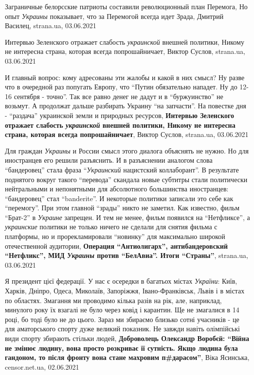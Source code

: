Заграничные белорсские патриоты составили революционный план Перемога, Но опыт
\emph{Украины} показывает, что за Перемогой всегда идет Зрада, Дмитрий Василец,
strana.ua, 03.06.2021

Интервью Зеленского отражает слабость \emph{украинской} внешней политики,
Никому не интересна страна, которая всегда попрошайничает, Виктор Суслов,
strana.ua, 03.06.2021

И главный вопрос: кому адресованы эти жалобы и какой в них смысл? Ну разве что
в очередной раз попугать Европу, что \enquote{Путин обязательно нападет. Ну до 12-16
сентября - точно}.  Так все равно денег не дадут и в \enquote{буржуинство} не возьмут.
А продолжат дальше разбирать Украину \enquote{на запчасти}.  На повестке дня -
\enquote{раздача} украинской земли и природных ресурсов,
\textbf{Интервью Зеленского отражает слабость \emph{украинской} внешней политики,
Никому не интересна страна, которая всегда попрошайничает}, Виктор Суслов,
strana.ua, 03.06.2021

Для граждан \emph{Украины} и России смысл этого диалога объяснять не нужно. Но для
иностранцев его решили разъяснить. И в разъяснении аналогом слова
\enquote{бандеровец} стала фраза \enquote{\emph{Украинский} нацистский коллаборант}. В
результате поднятого вокруг такого \enquote{перевода} скандала новые субтитры
стали политически нейтральными и непонятными для абсолютного большинства
иностранцев: \enquote{бандеровец} стал \enquote{banderite}. И некоторые
политики записали это себе как \enquote{перемогу}. При этом главной
\enquote{зрады} никто не заметил.  Как известно, фильм \enquote{Брат-2} в
\emph{Украине} запрещен. И тем не менее, фильм появился на \enquote{Нетфликсе}, а
\emph{украинские} политики не только ничего не сделали для снятия фильма с платформы,
но и прорекламировали \enquote{новинку} для максимально широкой отечественной
аудитории,
\textbf{Операция \enquote{Антиолигарх}, антибандеровский \enquote{Нетфликс},
МИД \emph{Украины} против \enquote{БелАвиа}. Итоги \enquote{Страны}},
strana.ua, 03.06.2021

Я президент цієї федерації. У нас є осередки в багатьох містах \emph{України}: Київ,
Харків, Дніпро, Одеса, Миколаїв, Запоріжжя, Івано-Франківськ, Львів і в містах
по областях. Змагання ми проводимо кілька разів на рік, але, наприклад,
минулого року їх взагалі не було через ковід і карантин. Ще не змагалися в 14
році, бо тоді було не до цього. Зараз ми збираємо близько сотні учасників - це
для аматорського спорту дуже великий показник. Не завжди навіть олімпійські
види спорту збирають стільки людей,
\textbf{Доброволець Олександр Воробєй: \enquote{Війна не змінює людину, вона
просто розкриває її сутність. Якщо людина була гандоном, то після фронту вона
стане махровим п\#дарасом}},
Віка Ясинська, censor.net.ua, 02.06.2021

